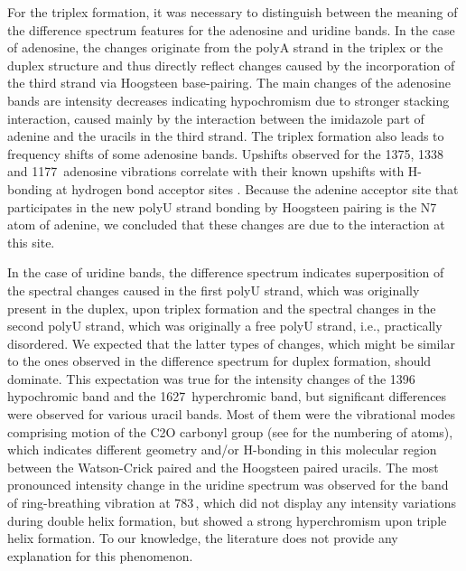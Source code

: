 For the triplex formation, it was necessary to distinguish between the meaning
of the difference spectrum features for the adenosine and uridine bands.
In the case of adenosine, the changes originate from the polyA strand in the
triplex or the duplex structure and thus directly reflect changes caused by the
incorporation of the third strand via Hoogsteen base-pairing.
The main changes of the adenosine bands are intensity decreases indicating
hypochromism due to stronger stacking interaction, caused mainly by the
interaction between the imidazole part of adenine and the uracils in the third
strand.
The triplex formation also leads to frequency shifts of some adenosine bands.
Upshifts observed for the 1375, 1338 and 1177\,\icm{} adenosine vibrations
correlate with their known upshifts with H-bonding at hydrogen bond acceptor
sites
\parencite{Fujimoto1998}.
Because the adenine acceptor site that participates in the new polyU strand
bonding by Hoogsteen pairing is the N7 atom of adenine, we concluded that these
changes are due to the interaction at this site.

In the case of uridine bands, the difference spectrum indicates superposition
of the spectral changes caused in the first polyU strand, which was originally
present in the duplex, upon triplex formation and the spectral changes in the
second polyU strand, which was originally a free polyU strand, i.e.,
practically disordered.
We expected that the latter types of changes, which might be similar to the
ones observed in the difference spectrum for duplex formation, should dominate.
This expectation was true for the intensity changes of the 1396\,\icm{}
hypochromic band and the 1627\,\icm{} hyperchromic band, but significant
differences were observed for various uracil bands.
Most of them were the vibrational modes comprising motion of the C2O carbonyl
group (see
for the numbering of atoms), which indicates different geometry and/or
H-bonding in this molecular region between the Watson-Crick paired and the
Hoogsteen paired uracils.
The most pronounced intensity change in the uridine spectrum was observed for
the band of ring-breathing vibration
\parencite{Fodor1985}
at 783\,\icm{}, which did not display any intensity variations during double
helix formation, but showed a strong hyperchromism upon triple helix formation.
To our knowledge, the literature does not provide any explanation for this
phenomenon.

